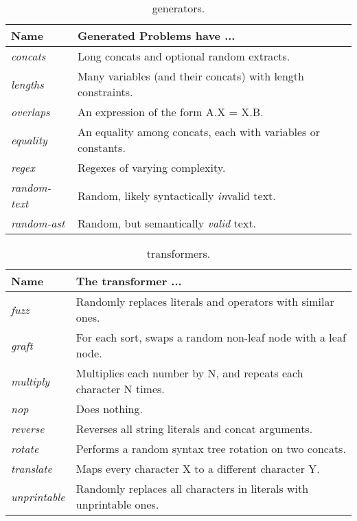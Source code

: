 \begin{table}[H]
    \caption{\generator{} generators.}
    \label{tbl:generators}
    \begin{tabular}{|l|l|}
        \hline
        \textbf{Name}        & \textbf{Generated Problems have ...} \\ \hline
        \textit{concats}     & Long concats and optional random extracts. \\ \hline
        \textit{lengths}     & Many variables (and their concats) with length constraints. \\ \hline
        \textit{overlaps}    & An expression of the form A.X = X.B. \\ \hline
        \textit{equality}    & An equality among concats, each with variables or constants. \\ \hline
        \textit{regex}       & Regexes of varying complexity. \\ \hline
        \textit{random-text} & Random, likely syntactically \textit{in}valid text. \\ \hline
        \textit{random-ast}  & Random, but semantically \textit{valid} text. \\ \hline
    \end{tabular}
\end{table}

\begin{table}[H]
    \caption{\transformer{} transformers.}
    \label{tbl:transformers}
    \begin{tabular}{|l|l|}
        \hline
        \textbf{Name}        & \textbf{The transformer ...} \\ \hline
        \textit{fuzz}        & Randomly replaces literals and operators with similar ones. \\ \hline
        \textit{graft}       & For each sort, swaps a random non-leaf node with a leaf node. \\ \hline
        \textit{multiply}    & Multiplies each number by N, and repeats each character N times. \\ \hline
        \textit{nop}         & Does nothing. \\ \hline
        \textit{reverse}     & Reverses all string literals and concat arguments. \\ \hline
        \textit{rotate}      & Performs a random syntax tree rotation on two concats. \\ \hline
        \textit{translate}   & Maps every character X to a different character Y. \\ \hline
        \textit{unprintable} & Randomly replaces all characters in literals with unprintable ones. \\ \hline
    \end{tabular}
\end{table}

